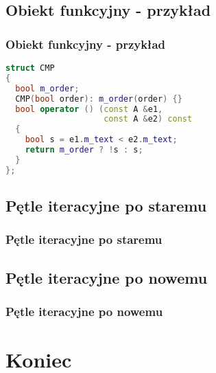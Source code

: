 \documentclass[compress]{beamer}
\begin{document}

\subsection{Obiekt funkcyjny - przykład}

\begin{frame}[fragile]

  \frametitle{Obiekt funkcyjny - przykład}

\begin{lstlisting}[language=C++]
struct CMP
{
  bool m_order;
  CMP(bool order): m_order(order) {}
  bool operator () (const A &e1,
                    const A &e2) const
  {
    bool s = e1.m_text < e2.m_text;
    return m_order ? !s : s;
  }
};
\end{lstlisting}

\end{frame}


\subsection{Pętle iteracyjne po staremu}

\begin{frame}

  \frametitle{Pętle iteracyjne po staremu}

  

\end{frame}


\subsection{Pętle iteracyjne po nowemu}

\begin{frame}

  \frametitle{Pętle iteracyjne po nowemu}

  

\end{frame}


\section{Koniec}
\end{document}
